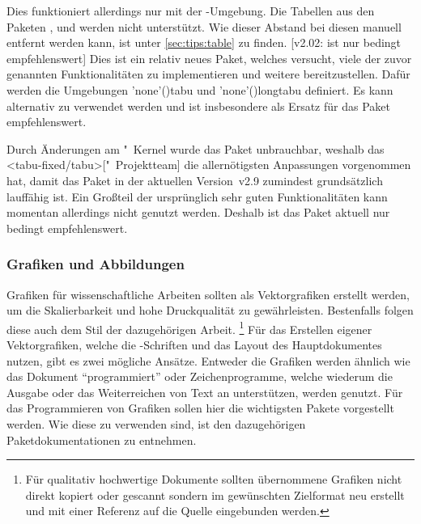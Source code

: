 \begin{DeclarePackages}[Tabellen|?]
  Dies funktioniert allerdings nur mit der -Umgebung. 
  Die Tabellen aus den Paketen ,  und 
   werden nicht unterstützt. Wie dieser Abstand bei diesen 
  manuell entfernt werden kann, ist unter \autoref{sec:tips:table} zu finden.
[v2.02: ist nur bedingt empfehlenswert]
  Dies ist ein relativ neues Paket, welches versucht, viele der zuvor genannten 
  Funktionalitäten zu implementieren und weitere bereitzustellen. Dafür werden 
  die Umgebungen \Environment'none'(){tabu} und 
  \Environment'none'(){longtabu} definiert. Es 
  kann alternativ zu  verwendet werden und ist insbesondere 
  als Ersatz für das Paket  empfehlenswert.
  
  
  Durch Änderungen am "~Kernel wurde das Paket unbrauchbar, 
  weshalb das \GitHubRepo<tabu-fixed/tabu>["~Projektteam] 
  die allernötigsten Anpassungen vorgenommen hat, damit das Paket in der 
  aktuellen Version~v2.9 zumindest grundsätzlich lauffähig ist. Ein Großteil 
  der ursprünglich sehr guten Funktionalitäten kann momentan allerdings nicht 
  genutzt werden. Deshalb ist das Paket aktuell nur bedingt empfehlenswert.
\end{DeclarePackages}



\subsubsection{%
  Grafiken und Abbildungen%
}

Grafiken für wissenschaftliche Arbeiten sollten als Vektorgrafiken erstellt 
werden, um die Skalierbarkeit und hohe Druckqualität zu gewährleisten. 
Bestenfalls folgen diese auch dem Stil der dazugehörigen Arbeit.%
\footnote{%
  Für qualitativ hochwertige Dokumente sollten übernommene Grafiken nicht 
  direkt kopiert oder gescannt sondern im gewünschten Zielformat neu erstellt 
  und mit einer Referenz auf die Quelle eingebunden werden.%
}
Für das Erstellen eigener Vektorgrafiken, welche die 
-Schriften 
und das Layout des Hauptdokumentes nutzen, gibt es zwei mögliche Ansätze. 
Entweder die Grafiken werden ähnlich wie das Dokument \enquote{programmiert} 
oder Zeichenprogramme, welche wiederum die Ausgabe oder das Weiterreichen von 
Text an  unterstützen, werden genutzt. 
Für das Programmieren von Grafiken sollen hier die wichtigsten Pakete 
vorgestellt werden. Wie diese zu verwenden sind, ist den dazugehörigen 
Paketdokumentationen zu entnehmen. 

